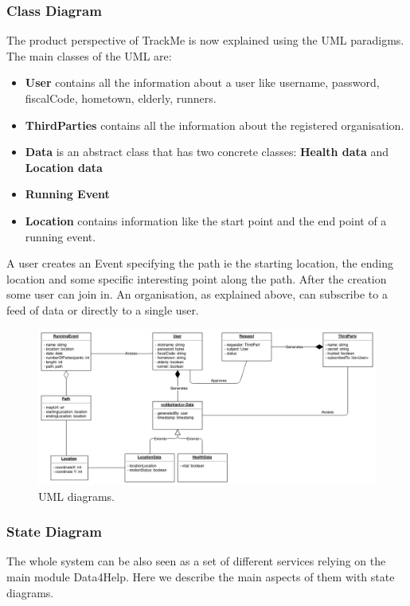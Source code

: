 \documentclass{article}
\begin{document}
\subsubsection{Class Diagram}
The product perspective of TrackMe is now explained using the UML paradigms.
The main classes of the UML are:
\begin{itemize}
	\item \textbf{User} contains all the information about a user like username, password, fiscalCode, hometown, elderly, runners.
	\item \textbf{ThirdParties} contains all the information about the registered organisation.
	\item \textbf{Data} is an abstract class that has two concrete classes: 
		\textbf{Health data} and	 \textbf{Location data}
	\item \textbf{Running Event} 
	\item \textbf{Location} contains information like the start point and the end point of a running event.
\end{itemize}

A user creates an Event specifying the path ie the starting location, the ending location and some specific interesting point along the path.
After the creation some user can join in.
An organisation, as explained above, can subscribe to a feed of data or directly to a single user.


\begin{figure}[h!]
  \includegraphics[width=\textwidth]{Figures/ClassDiagram.png}
  \caption{UML diagrams.}
\end{figure}
\newpage

\subsubsection{State Diagram}
The whole system can be also seen as a set of different services relying on the main module Data4Help.
Here we describe the main aspects of them with state diagrams.
\end{document}
